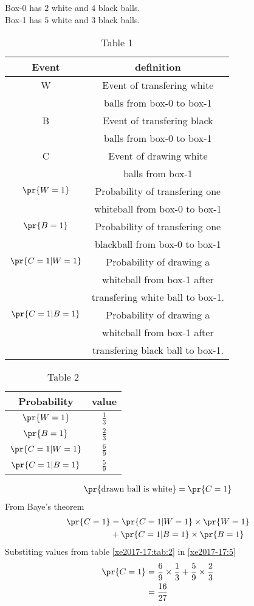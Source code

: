 Box-0 has $2$ white and $4$ black balls.\\
Box-1 has $5$ white and $3$ black balls.\\
\begin{table}[h!]
\resizebox{9cm}{!}
{ 
\begin{tabular}{|c|c|}
\hline
Event & definition \\
\hline
W & Event of transfering white\\
&  balls from box-0 to box-1\\
\hline
B & Event of transfering black \\
& balls from box-0 to box-1\\
\hline
C  & Event of drawing white\\
& balls from box-1 \\
\hline
$\pr{W=1}$ & Probability of transfering one\\
&  whiteball  from box-0 to box-1 \\
\hline
$\pr{B=1}$ &Probability of transfering one \\
& blackball from box-0 to box-1 \\
\hline
$\pr{C=1|W=1}$ & Probability of drawing a\\
&  whiteball  from box-1 after\\
& transfering white ball to box-1.\\
\hline
$\pr{C=1|B=1}$ & Probability of drawing a\\
&  whiteball from box-1 after\\
&  transfering  black ball to box-1.\\
\hline
\end{tabular}
}
\caption{Table 1} 
\label{xe2017-17:tab:1}
\end{table}
\begin{table}[h!]
\resizebox{7cm}{!}
{ 
\begin{tabular}{|c|c|}
\hline
Probability &  value\\
\hline
$\pr{W=1}$ & $\frac{1}{3}$ \\
\hline
$\pr{B=1}$ &   $\frac{2}{3}$ \\
\hline
$\pr{C=1|W=1}$ & $\frac{6}{9}$ \\
\hline
 $\pr{C=1|B=1}$ &   $\frac{5}{9}$ \\
\hline
\end{tabular}
}
\caption{Table 2} 
\label{xe2017-17:tab:2}
\end{table}
\begin{align}
\pr{\text{drawn ball is white}}&= \pr{C=1}\\
\end{align}
 From Baye's theorem
\begin{align}
\pr{C=1}&=\pr{C=1|W=1} \times \pr{W=1} \notag \\
 & +\pr{C=1|B=1} \times \pr{B=1}  \label{xe2017-17:5}
\end{align}
Substiting values from table \eqref{xe2017-17:tab:2} in \eqref{xe2017-17:5}
\begin{align}
\pr{C=1} &= \frac{6}{9} \times \frac{1}{3}  + \frac{5}{9} \times \frac{2}{3} \\
&=\frac{16}{27} \label{xe2017-17:6}
\end{align}